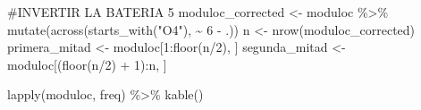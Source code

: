 \documentclass[
  letterpaper,
  DIV=11,
  numbers=noendperiod]{scrartcl}
\newenvironment{Shaded}{\begin{snugshade}}{\end{snugshade}}
\newcommand{\CommentTok}[1]{\textcolor[rgb]{0.37,0.37,0.37}{#1}}
\newcommand{\DecValTok}[1]{\textcolor[rgb]{0.68,0.00,0.00}{#1}}
\newcommand{\FunctionTok}[1]{\textcolor[rgb]{0.28,0.35,0.67}{#1}}
\newcommand{\NormalTok}[1]{\textcolor[rgb]{0.00,0.23,0.31}{#1}}
\newcommand{\OtherTok}[1]{\textcolor[rgb]{0.00,0.23,0.31}{#1}}
\newcommand{\SpecialCharTok}[1]{\textcolor[rgb]{0.37,0.37,0.37}{#1}}
\newcommand{\StringTok}[1]{\textcolor[rgb]{0.13,0.47,0.30}{#1}}
\begin{document}
\begin{Shaded}
\begin{Highlighting}[]
\CommentTok{\#INVERTIR LA BATERIA 5}
\NormalTok{moduloc\_corrected }\OtherTok{\textless{}{-}}\NormalTok{ moduloc }\SpecialCharTok{\%\textgreater{}\%}
  \FunctionTok{mutate}\NormalTok{(}\FunctionTok{across}\NormalTok{(}\FunctionTok{starts\_with}\NormalTok{(}\StringTok{"O4"}\NormalTok{), }\SpecialCharTok{\textasciitilde{}} \DecValTok{6} \SpecialCharTok{{-}}\NormalTok{ .))}
\NormalTok{n }\OtherTok{\textless{}{-}} \FunctionTok{nrow}\NormalTok{(moduloc\_corrected)}
\NormalTok{primera\_mitad  }\OtherTok{\textless{}{-}}\NormalTok{ moduloc[}\DecValTok{1}\SpecialCharTok{:}\FunctionTok{floor}\NormalTok{(n}\SpecialCharTok{/}\DecValTok{2}\NormalTok{), ]}
\NormalTok{segunda\_mitad  }\OtherTok{\textless{}{-}}\NormalTok{ moduloc[(}\FunctionTok{floor}\NormalTok{(n}\SpecialCharTok{/}\DecValTok{2}\NormalTok{) }\SpecialCharTok{+} \DecValTok{1}\NormalTok{)}\SpecialCharTok{:}\NormalTok{n, ]}
\end{Highlighting}
\end{Shaded}

\begin{Shaded}
\begin{Highlighting}[]
\FunctionTok{lapply}\NormalTok{(moduloc, freq) }\SpecialCharTok{\%\textgreater{}\%} \FunctionTok{kable}\NormalTok{()}
\end{Highlighting}
\end{Shaded}
\end{document}
